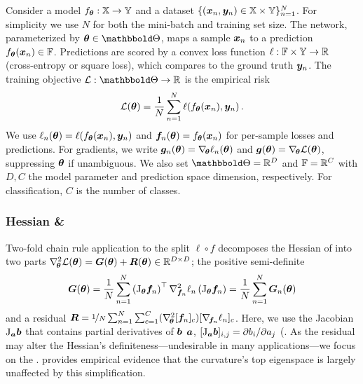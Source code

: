 Consider a model $f_{{\bm{\theta}}}: {\mathbb{X}} \rightarrow {\mathbb{Y}}$ and a dataset
$\{({\bm{x}}_n, {\bm{y}}_n) \in {\mathbb{X}} \times {\mathbb{Y}}\}_{n=1}^N$. For simplicity we use $N$ for
both the mini-batch and training set size. The network, parameterized by
$\vtheta \in \sTheta$, maps a sample ${\bm{x}}_n$ to a prediction $f_{{\bm{\theta}}}({\bm{x}}_n)
\in {\mathbb{F}}$. Predictions are scored by a convex loss function $\ell : {\mathbb{F}} \times
{\mathbb{Y}} \rightarrow \mathbb{R}$ (\eg cross-entropy or square loss), which compares to the
ground truth ${\bm{y}}_n$. The training objective $\mathcal{L}: \sTheta \rightarrow
\R$ is the empirical risk
\begin{equation}
  \label{vivit::eq:objective-function}
  {\mathcal{L}}({\bm{\theta}}) = \frac{1}{N} \sum_{n=1}^N \ell(f_{{\bm{\theta}}}({\bm{x}}_n), {\bm{y}}_n)\,.
\end{equation}
We use $\ell_n({\bm{\theta}}) = \ell(f_{{\bm{\theta}}}({\bm{x}}_n), {\bm{y}}_n)$ and ${\bm{f}}_n({\bm{\theta}}) =
f_{{\bm{\theta}}}({\bm{x}}_n)$ for per-sample losses and predictions. For gradients, we
write ${\bm{g}}_n({\bm{\theta}}) = \nabla_{\!{{\bm{\theta}}}}\ell_n({\bm{\theta}})$ and ${\bm{g}}({\bm{\theta}}) =
\nabla_{\!{{\bm{\theta}}}} {\mathcal{L}}({\bm{\theta}})$, suppressing ${\bm{\theta}}$ if unambiguous. We also
set $\sTheta = \sR^D$ and ${\mathbb{F}} = {\mathbb{R}}^C$ with $D,C$ the model parameter and
prediction space dimension, respectively. For classification, $C$ is the number
of classes.

\subsubsection{Hessian \& \ggn}

Two-fold chain rule application to the split $\ell \circ f$ decomposes the
Hessian of  into two parts
$\nabla_{\!{{\bm{\theta}}}}^{2} {\mathcal{L}}({\bm{\theta}}) = {\bm{G}}({\bm{\theta}}) + {\bm{R}}({\bm{\theta}}) \in
{\mathbb{R}}^{D\times D}$; the positive semi-definite \ggn
\begin{equation}
  \label{vivit::eq:ggn}
  \mG(\vtheta)
  =
  \frac{1}{N}
  \sum_{n=1}^N
  \left(
    \jac_{\vtheta} \vf_n%
  \right)^\top
  \nabla_{\vf_n}^2\ell_n%
  \left(
    \jac_{\vtheta} \vf_n%
  \right)
  =
  \frac{1}{N}
  \sum_{n=1}^N
  \mG_n(\vtheta)
\end{equation}
and a residual $\mR%
= \nicefrac{1}{N}\sum_{n=1}^N\sum_{c=1}^C (\gradsquared{\vtheta}
[\vf_n%
]_c) [\grad{\vf_n}\ell_n%
]_c$. Here, we use the Jacobian $\mathrm{J}_{{\bm{a}}} {\bm{b}}$ that contains partial
derivatives of ${\bm{b}}$ \wrt ${\bm{a}}$, $[\mathrm{J}_{{\bm{a}}} {\bm{b}}]_{i,j} = \partial {b}_i /
\partial {a}_j$ (. As the residual
may alter the Hessian's definiteness---undesirable in many applications---we
focus on the \ggn.  provides empirical
evidence that the curvature's top eigenspace is largely unaffected by this
simplification.

